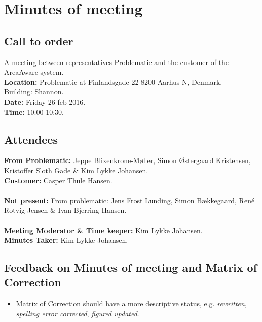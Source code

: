 %
\thispagestyle{fancy}
\chapter*{Minutes of meeting}


\section*{Call to order}
A meeting between representatives Problematic and the customer of the AreaAware system.\\
\textbf{Location:} Problematic at Finlandsgade 22 8200 Aarhus N, Denmark.\\ Building: Shannon.\\
\textbf{Date:} Friday 26-feb-2016. \\
\textbf{Time:} 10:00-10:30.
\section*{Attendees}
\textbf{From Problematic:} Jeppe Blixenkrone-Møller, Simon Østergaard Kristensen,  Kristoffer Sloth Gade \& Kim Lykke Johansen.\\
\textbf{Customer:} Casper Thule Hansen.\\\\
\textbf{Not present:} From problematic: Jens Frost Lunding, Simon Bækkegaard, René Rotvig Jensen \& Ivan Bjerring Hansen.\\\\
\textbf{Meeting Moderator \& Time keeper:} Kim Lykke Johansen. \\
\textbf{Minutes Taker:} Kim Lykke Johansen.

\section*{Feedback on Minutes of meeting and Matrix of Correction}
\begin{itemize}
    \item Matrix of Correction should have a more descriptive status, e.g. \emph{rewritten}, \emph{spelling error corrected}, \emph{figured updated}.
\end{itemize}

\newpage
